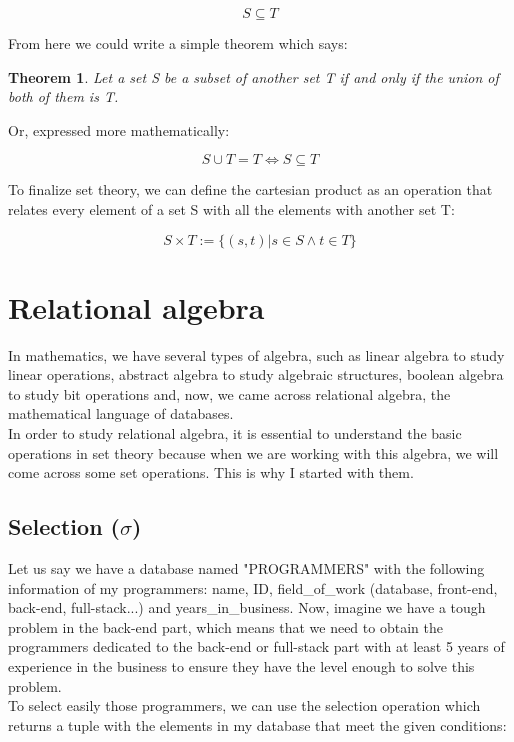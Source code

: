 \documentclass[12pt]{article}
\newtheorem{theorem}{Theorem}
\begin{document}
\[
    S \subseteq T
\]

From here we could write a simple theorem which says:

\begin{theorem}
Let a set S be a subset of another set T if and only if the union of both of them is T.
\end{theorem}

Or, expressed more mathematically:

\[
    S \cup T = T \iff S \subseteq T
\]

To finalize set theory, we can define the cartesian product as an operation that relates every element of a set S with all the elements with another set T:

\[
    S \times T := \{ (s, t)| s\in S \wedge t\in T\}
\]

\section{Relational algebra}

In mathematics, we have several types of algebra, such as linear algebra to study linear operations, abstract algebra to study algebraic structures, boolean algebra to study bit operations and, now, we came across relational algebra, the mathematical language of databases.\\
In order to study relational algebra,  it is essential to understand the basic operations in set theory because when we are working with this algebra, we will come across some set operations. This is why I started with them.\\

\subsection{Selection (\(\sigma\))}

Let us say we have a database named "PROGRAMMERS" with the following information of my programmers: name, ID, field\_of\_work (database, front-end, back-end, full-stack...) and years\_in\_business. Now, imagine we have a tough problem in the back-end part, which means that we need to obtain the programmers dedicated to the back-end or full-stack part with at least 5 years of experience in the business to ensure they have the level enough to solve this problem.\\
To select easily those programmers, we can use the selection operation which returns a tuple with the elements in my database that meet the given conditions:
\end{document}
